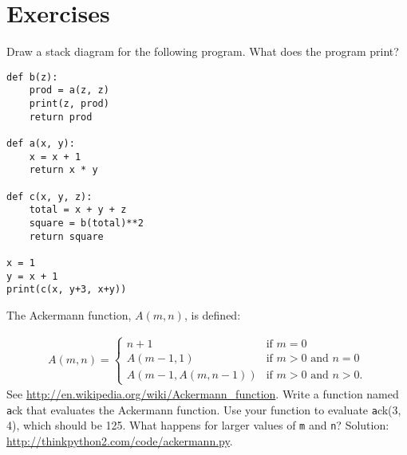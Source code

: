 \documentclass[
DIV=11,
fontsize=12,
twoside,
headinclude=false,
titlepage=firstiscover,
abstract=true,
headsepline=true,
footsepline=true,
chapterprefix=true, %
headings=big,
bibliography=totoc,%
captions=tableheading
]{scrbook}
\theoremstyle{definition}
\begin{document}
\section{Exercises}

\begin{exercise}
\normalfont

Draw a stack diagram for the following program.  What does the program print?

\begin{lstlisting}
def b(z):
    prod = a(z, z)
    print(z, prod)
    return prod

def a(x, y):
    x = x + 1
    return x * y

def c(x, y, z):
    total = x + y + z
    square = b(total)**2
    return square

x = 1
y = x + 1
print(c(x, y+3, x+y))
\end{lstlisting}

\end{exercise}


\begin{exercise}
\normalfont
\label{ackermann}

The Ackermann function, $A(m, n)$, is defined:

\begin{eqnarray*}
A(m, n) = \begin{cases} 
              n+1 & \mbox{if } m = 0 \\ 
        A(m-1, 1) & \mbox{if } m > 0 \mbox{ and } n = 0 \\ 
A(m-1, A(m, n-1)) & \mbox{if } m > 0 \mbox{ and } n > 0.
\end{cases} 
\end{eqnarray*}
%
See \url{http://en.wikipedia.org/wiki/Ackermann_function}.
Write a function named {\texttt ack} that evaluates the Ackermann function.
Use your function to evaluate {\texttt ack(3, 4)}, which should be 125.
What happens for larger values of {\texttt m} and {\texttt n}?
Solution: \url{http://thinkpython2.com/code/ackermann.py}.

\end{exercise}
\end{document}
